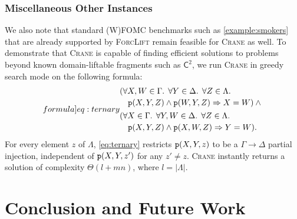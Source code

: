 \documentclass{article}
\newcommand{\Ctwo}{$\mathsf{C}^{2}$}
\newcommand{\predicate}{\texttt{\textup{p}}}
\begin{document}
\subsubsection{Miscellaneous Other Instances}
We also note that standard (W)FOMC benchmarks such as \cref{example:smokers}
that are already supported by \textsc{ForcLift} remain feasible for
\textsc{Crane} as well. To demonstrate that \textsc{Crane} is capable of finding
efficient solutions to problems beyond known domain-liftable fragments such as
\Ctwo{}, we run \textsc{Crane} in greedy search mode on the following formula:
\begin{equation}\label[formula]{eq:ternary}
  \begin{split}
    &\begin{multlined}[t]
      (\forall X,W \in \Gamma\text{. }\forall Y \in \Delta\text{. }\forall Z \in \Lambda\text{. }\\
      \predicate(X, Y, Z) \land \predicate(W, Y, Z) \Rightarrow X = W) \land{}
    \end{multlined}\\
    &\begin{multlined}[t]
      (\forall X \in \Gamma\text{. }\forall Y,W \in \Delta\text{. }\forall Z \in \Lambda\text{. }\\
      \predicate(X, Y, Z) \land \predicate(X, W, Z) \Rightarrow Y = W).
    \end{multlined}
  \end{split}
\end{equation}
For every element $z$ of $\Lambda$, \cref{eq:ternary} restricts
$\predicate(X, Y, z)$ to be a $\Gamma \to \Delta$ partial injection, independent
of $\predicate(X, Y, z')$ for any $z' \ne z$. \textsc{Crane} instantly returns a
solution of complexity $\Theta(l+mn)$, where $l = |\Lambda|$.

\section{Conclusion and Future Work}\label{sec:conclusion}
\setlength{\multlinegap}{0pt}
\end{document}
